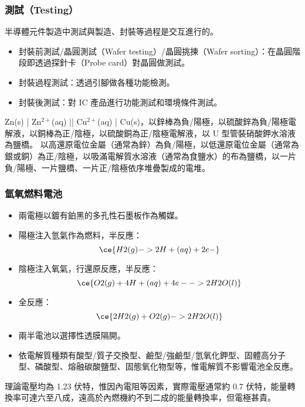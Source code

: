 \documentclass[a4paper,12pt]{report}
\begin{document}
\begin{itemize}
\begin{itemize}
\subsubsection{測試（Testing）}
半導體元件製造中測試與製造、封裝等過程是交互進行的。
\begin{itemize}
\item 封裝前測試/晶圓測試（Wafer testing）/晶圓挑揀（Wafer sorting）：在晶圓階段即透過探針卡（Probe card）對晶圓做測試。
\item 封裝過程測試：透過引腳做各種功能檢測。
\item 封裝後測試：對 IC 產品進行功能測試和環境條件測試。
\end{itemize}
Zn(s) | Zn$^{2+}$(aq) || Cu$^{2+}$(aq) | Cu(s)，以鋅棒為負/陽極，以硫酸鋅為負/陽極電解液，以銅棒為正/陰極，以硫酸銅為正/陰極電解液，以 U 型管裝硝酸鉀水溶液為鹽橋。
以高還原電位金屬（通常為鋅）為負/陽極，以低還原電位金屬（通常為銀或銅）為正/陰極，以吸滿電解質水溶液（通常為食鹽水）的布為鹽橋，以一片負/陽極、一片鹽橋、一片正/陰極依序堆疊製成的電堆。
\subsubsection{氫氧燃料電池}
\begin{itemize}
\item 兩電極以鍍有鉑黑的多孔性石墨板作為觸媒。
\item 陽極注入氫氣作為燃料，半反應：
\[\ce{H2(g) -> 2H+(aq) + 2e-}\]
\item 陰極注入氧氣，行還原反應，半反應：
\[\ce{O2(g) + 4H+(aq) + 4e- -> 2H2O(l)}\]
\item 全反應：
\[\ce{2H2(g) + O2(g) -> 2H2O(l)}\]
\item 兩半電池以選擇性透膜隔開。
\item 依電解質種類有酸型/質子交換型、鹼型/強鹼型/氫氧化鉀型、固體高分子型、磷酸型、熔融碳酸鹽型、固態氧化物型等，惟電解質不影響電池全反應。
\end{itemize}
理論電壓均為 1.23 伏特，惟因內電阻等因素，實際電壓通常約 0.7 伏特，能量轉換率可達六至八成，遠高於內燃機約不到二成的能量轉換率，但電極甚貴。

\end{itemize}
\end{itemize}
\end{document}
